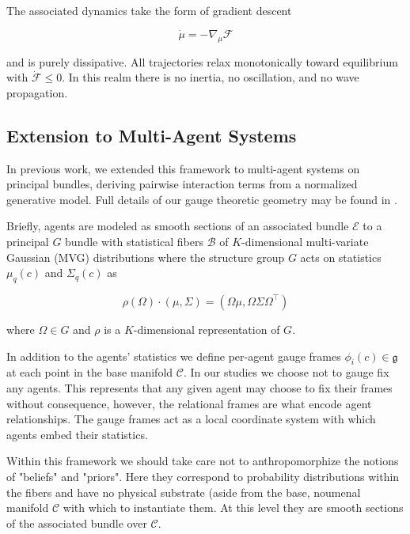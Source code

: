 \documentclass[11pt]{article}
\begin{document}
The associated dynamics take the form of gradient descent

\begin{equation}
\dot{\mu} = -\nabla_\mu \mathcal{F}
\label{eq:gradient_descent}
\end{equation}

and is purely dissipative.  All trajectories relax monotonically toward equilibrium with $\dot{\mathcal{F}} \leq 0$. In this realm there is no inertia, no oscillation, and no wave propagation. 

\subsection{Extension to Multi-Agent Systems}

In previous work, we extended this framework to multi-agent systems on principal bundles, deriving pairwise interaction terms from a normalized generative model. Full details of our gauge theoretic geometry may be found in \cite{Dennis2025}. 

Briefly, agents are modeled as smooth sections of an associated bundle $\mathcal{E}$ to a principal $G$ bundle with statistical fibers $\mathcal{B}$ of $K$-dimensional multi-variate Gaussian (MVG) distributions where the structure group $G$ acts on statistics $\mu_q(c)$ and $\Sigma_q(c)$ as

\begin{equation}
    \rho(\Omega) \cdot (\mu, \Sigma) = (\Omega\mu, \Omega\Sigma\Omega^\top)
\end{equation}

where $\Omega \in G$ and $\rho$ is a $K$-dimensional representation of $G$.

In addition to the agents' statistics we define per-agent gauge frames  $\phi_i(c) \in \mathfrak{g}$ at each point in the base manifold $\mathcal{C}$.  In our studies we choose not to gauge fix any agents.  This represents that any given agent may choose to fix their frames without consequence, however, the relational frames are what encode agent relationships. The gauge frames act as a local coordinate system with which agents embed their statistics.

Within this framework we should take care not to anthropomorphize the notions of "beliefs" and "priors".  Here they correspond to probability distributions within the fibers and have no physical substrate (aside from the base, noumenal manifold $\mathcal{C}$ with which to instantiate them.  At this level they are smooth sections of the associated bundle over $\mathcal{C}$.
\end{document}
